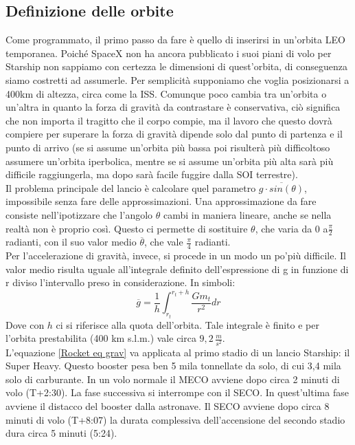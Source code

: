 \subsection{Definizione delle orbite}
\label{Definizione orbite}
Come programmato, il primo passo da fare è quello di inserirsi in un'orbita LEO temporanea. Poiché SpaceX non ha ancora pubblicato i suoi piani di volo per Starship non sappiamo con certezza le dimensioni di quest'orbita, di conseguenza siamo costretti ad assumerle. Per semplicità supponiamo che voglia posizionarsi a 400km di altezza, circa come la ISS. Comunque poco cambia tra un'orbita o un'altra in quanto la forza di gravità da contrastare è conservativa, ciò significa che non importa il tragitto che il corpo compie, ma il lavoro che questo dovrà compiere per superare la forza di gravità dipende solo dal punto di partenza e il punto di arrivo (se si assume  un'orbita più bassa poi risulterà più difficoltoso assumere un'orbita iperbolica, mentre se si assume un'orbita più alta sarà più difficile raggiungerla, ma dopo sarà facile fuggire dalla SOI terrestre).\\
Il problema principale del lancio è calcolare quel parametro $\overline{g \cdot sin(\theta)}$, impossibile senza fare delle approssimazioni. Una approssimazione da fare consiste nell'ipotizzare che l'angolo $\theta$ cambi in maniera lineare, anche se nella realtà non è proprio così. Questo ci permette di sostituire $\theta$, che varia da 0 a$\frac{\pi}{2}$ radianti, con il suo valor medio $\overline{\theta}$, che vale $\frac{\pi}{4}$ radianti. \\
Per l'accelerazione di gravità, invece, si procede in un modo un po'più difficile. Il valor medio risulta uguale all'integrale definito dell'espressione di g in funzione di r diviso l'intervallo preso in considerazione. In simboli:
$$
\overline{g} = \frac{1}{h}\int_{r_t}^{r_t+h}{\frac{Gm_t}{r^2}dr}
$$
Dove con $h$ ci si riferisce alla quota dell'orbita. Tale integrale è finito e per l'orbita prestabilita (400 km s.l.m.) vale circa $9,2 \, \frac{m}{s^2}$.\\
L'equazione \ref{Rocket eq grav} va applicata al primo stadio di un lancio Starship: il Super Heavy. Questo booster pesa ben 5 mila tonnellate da solo, di cui 3,4 mila solo di carburante. In un volo normale il MECO avviene dopo circa 2 minuti di volo (T+2:30). La fase successiva si interrompe con il SECO. In quest'ultima fase avviene il distacco del booster dalla astronave. Il SECO avviene dopo circa 8 minuti di volo (T+8:07) la durata complessiva dell'accensione del secondo stadio dura circa 5 minuti (5:24).
